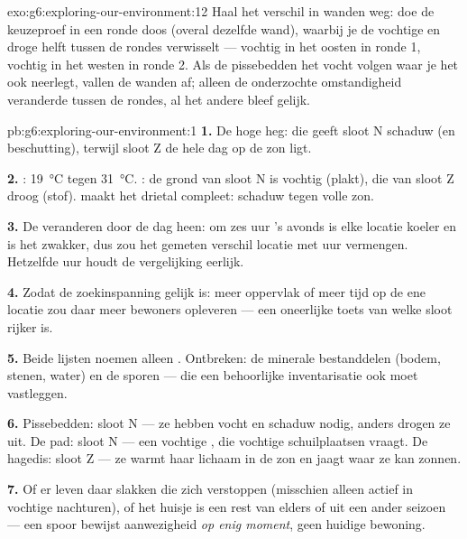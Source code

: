 \begin{solution}{exo:g6:exploring-our-environment:12}
Haal het verschil in wanden weg: doe de keuzeproef in een ronde doos
(overal dezelfde wand), waarbij je de vochtige en droge helft tussen de
rondes verwisselt --- vochtig in het oosten in ronde 1, vochtig in het
westen in ronde 2. Als de pissebedden het vocht volgen waar je het ook
neerlegt, vallen de wanden af; alleen de onderzochte omstandigheid
veranderde tussen de rondes, al het andere bleef gelijk.
\end{solution}

\begin{solution}{pb:g6:exploring-our-environment:1}
\textbf{1.} De hoge heg: die geeft sloot N schaduw (en beschutting),
terwijl sloot Z de hele dag op de zon ligt.

\textbf{2.} : \qty{19}{\degreeCelsius} tegen
\qty{31}{\degreeCelsius}. : de grond van sloot N is vochtig
(plakt), die van sloot Z droog (stof).  maakt het drietal compleet:
schaduw tegen volle zon.

\textbf{3.} De  veranderen door de dag heen: om zes uur
's avonds is elke locatie koeler en is het  zwakker, dus zou het
gemeten verschil locatie met uur vermengen. Hetzelfde uur houdt de
vergelijking eerlijk.

\textbf{4.} Zodat de zoekinspanning gelijk is: meer oppervlak of meer
tijd op de ene locatie zou daar meer bewoners opleveren --- een oneerlijke
toets van welke sloot rijker is.

\textbf{5.} Beide lijsten noemen alleen . Ontbreken: de
minerale bestanddelen (bodem, stenen, water) en de sporen --- die een
behoorlijke inventarisatie ook moet vastleggen.

\textbf{6.} Pissebedden: sloot N --- ze hebben vocht en schaduw nodig,
anders drogen ze uit. De pad: sloot N --- een vochtige , die vochtige
schuilplaatsen vraagt. De hagedis: sloot Z --- ze warmt haar lichaam in
de zon en jaagt waar ze kan zonnen.

\textbf{7.} Of er leven daar slakken die zich verstoppen (misschien
alleen actief in vochtige nachturen), of het huisje is een rest van
elders of uit een ander seizoen --- een spoor bewijst aanwezigheid
\emph{op enig moment}, geen huidige bewoning.


\end{solution}
